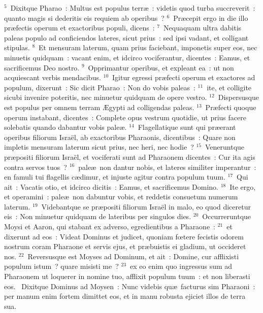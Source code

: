 ${}^{5}$~Dixitque Pharao~: Multus est populus terr\ae~: videtis quod turba succreverit~: quanto magis si dederitis eis requiem ab operibus~?
${}^{6}$~Pr\ae cepit ergo in die illo pr\ae fectis operum et exactoribus populi, dicens~:
${}^{7}$~Nequaquam ultra dabitis paleas populo ad conficiendos lateres, sicut prius~: sed ipsi vadant, et colligant stipulas.
${}^{8}$~Et mensuram laterum, quam prius faciebant, imponetis super eos, nec minuetis quidquam~: vacant enim, et idcirco vociferantur, dicentes~: Eamus, et sacrificemus Deo nostro.
${}^{9}$~Opprimantur operibus, et expleant ea~: ut non acquiescant verbis mendacibus.
${}^{10}$~Igitur egressi pr\ae fecti operum et exactores ad populum, dixerunt~: Sic dicit Pharao~: Non do vobis paleas~:
${}^{11}$~ite, et colligite sicubi invenire poteritis, nec minuetur quidquam de opere vestro.
${}^{12}$~Dispersusque est populus per omnem terram \AE gypti ad colligendas paleas.
${}^{13}$~Pr\ae fecti quoque operum instabant, dicentes~: Complete opus vestrum quotidie, ut prius facere solebatis quando dabantur vobis pale\ae .
${}^{14}$~Flagellatique sunt qui pr\ae erant operibus filiorum Isra\"el, ab exactoribus Pharaonis, dicentibus~: Quare non impletis mensuram laterum sicut prius, nec heri, nec hodie~?
${}^{15}$~Veneruntque pr\ae positi filiorum Isra\"el, et vociferati sunt ad Pharaonem dicentes~: Cur ita agis contra servos tuos~?
${}^{16}$~pale\ae\ non dantur nobis, et lateres similiter imperantur~: en famuli tui flagellis c\ae dimur, et injuste agitur contra populum tuum.
${}^{17}$~Qui ait~: Vacatis otio, et idcirco dicitis~: Eamus, et sacrificemus Domino.
${}^{18}$~Ite ergo, et operamini~: pale\ae\ non dabuntur vobis, et reddetis consuetum numerum laterum.
${}^{19}$~Videbantque se pr\ae positi filiorum Isra\"el in malo, eo quod diceretur eis~: Non minuetur quidquam de lateribus per singulos dies.
${}^{20}$~Occurreruntque Moysi et Aaron, qui stabant ex adverso, egredientibus a Pharaone~:
${}^{21}$~et dixerunt ad eos~: Videat Dominus et judicet, quoniam fœtere fecistis odorem nostrum coram Pharaone et servis ejus, et pr\ae buistis ei gladium, ut occideret nos.
${}^{22}$~Reversusque est Moyses ad Dominum, et ait~: Domine, cur afflixisti populum istum~? quare misisti me~?
${}^{23}$~ex eo enim quo ingressus sum ad Pharaonem ut loquerer in nomine tuo, afflixit populum tuum~: et non liberasti eos.
~\lettrine[lines=10,image=true,loversize=0.05,lraise=-0.03]{D}{}ixitque Dominus ad Moysen~: Nunc videbis qu\ae\ facturus sim Pharaoni~: per manum enim fortem dimittet eos, et in manu robusta ejiciet illos de terra sua.
